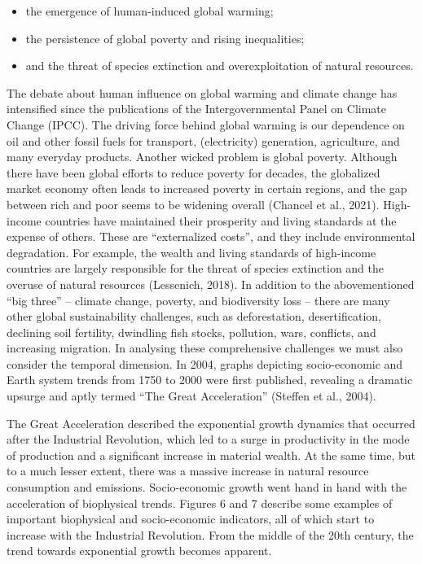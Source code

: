 \documentclass[
  letterpaper,
  DIV=11,
  numbers=noendperiod]{scrreprt}
\begin{document}
\begin{itemize}
\item
  the emergence of human-induced global warming;
\item
  the persistence of global poverty and rising inequalities;
\item
  and the threat of species extinction and overexploitation of natural
  resources.
\end{itemize}

The debate about human influence on global warming and climate change
has intensified since the publications of the Intergovernmental Panel on
Climate Change (IPCC). The driving force behind global warming is our
dependence on oil and other fossil fuels for transport, (electricity)
generation, agriculture, and many everyday products. Another wicked
problem is global poverty. Although there have been global efforts to
reduce poverty for decades, the globalized market economy often leads to
increased poverty in certain regions, and the gap between rich and poor
seems to be widening overall (Chancel et al., 2021). High-income
countries have maintained their prosperity and living standards at the
expense of others. These are ``externalized costs'', and they include
environmental degradation. For example, the wealth and living standards
of high-income countries are largely responsible for the threat of
species extinction and the overuse of natural resources (Lessenich,
2018). In addition to the abovementioned ``big three'' -- climate
change, poverty, and biodiversity loss -- there are many other global
sustainability challenges, such as deforestation, desertification,
declining soil fertility, dwindling fish stocks, pollution, wars,
conflicts, and increasing migration. In analysing these comprehensive
challenges we must also consider the temporal dimension. In 2004, graphs
depicting socio-economic and Earth system trends from 1750 to 2000 were
first published, revealing a dramatic upsurge and aptly termed ``The
Great Acceleration'' (Steffen et al., 2004).

The Great Acceleration described the exponential growth dynamics that
occurred after the Industrial Revolution, which led to a surge in
productivity in the mode of production and a significant increase in
material wealth. At the same time, but to a much lesser extent, there
was a massive increase in natural resource consumption and emissions.
Socio-economic growth went hand in hand with the acceleration of
biophysical trends. Figures 6 and 7 describe some examples of important
biophysical and socio-economic indicators, all of which start to
increase with the Industrial Revolution. From the middle of the 20th
century, the trend towards exponential growth becomes apparent.
\end{document}
